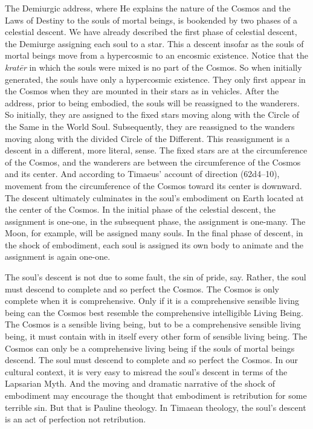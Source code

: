 The Demiurgic address, where He explains the nature of the Cosmos and the Laws of Destiny to the souls of mortal beings, is bookended by two phases of a celestial descent. We have already described the first phase of celestial descent, the Demiurge assigning each soul to a star. This a descent insofar as the souls of mortal beings move from a hypercosmic to an encosmic existence. Notice that the \emph{kratēr} in which the souls were mixed is no part of the Cosmos. So when initially generated, the souls have only a hypercosmic existence. They only first appear in the Cosmos when they are mounted in their stars as in vehicles. After the address, prior to being embodied, the souls will be reassigned to the wanderers. So initially, they are assigned to the fixed stars moving along with the Circle of the Same in the World Soul. Subsequently, they are reassigned to the wanders moving along with the divided Circle of the Different. This reassignment is a descent in a different, more literal, sense. The fixed stars are at the circumference of the Cosmos, and the wanderers are between the circumference of the Cosmos and its center. And according to Timaeus' account of direction (62d4–10), movement from the circumference of the Cosmos toward its center is downward. The descent ultimately culminates in the soul's embodiment on Earth located at the center of the Cosmos. In the initial phase of the celestial descent, the assignment is one-one, in the subsequent phase, the assignment is one-many. The Moon, for example, will be assigned many souls. In the final phase of descent, in the shock of embodiment, each soul is assigned its own body to animate and the assignment is again one-one.

The soul's descent is not due to some fault, the sin of pride, say. Rather, the soul must descend to complete and so perfect the Cosmos. The Cosmos is only complete when it is comprehensive. Only if it is a comprehensive sensible living being can the Cosmos best resemble the comprehensive intelligible Living Being. The Cosmos is a sensible living being, but to be a comprehensive sensible living being, it must contain with in itself every other form of sensible living being. The Cosmos can only be a comprehensive living being if the souls of mortal beings descend. The soul must descend to complete and so perfect the Cosmos. In our cultural context, it is very easy to misread the soul's descent in terms of the Lapsarian Myth. And the moving and dramatic narrative of the shock of embodiment may encourage the thought that embodiment is retribution for some terrible sin. But that is Pauline theology. In Timaean theology, the soul's descent is an act of perfection not retribution.

